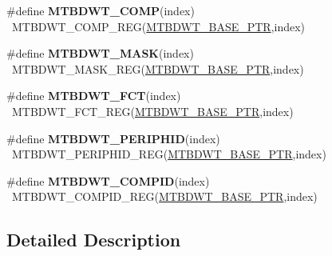 \begin{DoxyCompactItemize}
\item 
\hypertarget{group___m_t_b_d_w_t___register___accessor___macros_ga0b5afc3bbf7fb33c708cb7ebff8d1b02}{}\#define {\bfseries M\+T\+B\+D\+W\+T\+\_\+\+C\+O\+M\+P}(index)                                          ~M\+T\+B\+D\+W\+T\+\_\+\+C\+O\+M\+P\+\_\+\+R\+E\+G(\hyperlink{group___m_t_b_d_w_t___peripheral_ga97d048bfb5a11293a38c444b8347ff42}{M\+T\+B\+D\+W\+T\+\_\+\+B\+A\+S\+E\+\_\+\+P\+T\+R},index)\label{group___m_t_b_d_w_t___register___accessor___macros_ga0b5afc3bbf7fb33c708cb7ebff8d1b02}

\item 
\hypertarget{group___m_t_b_d_w_t___register___accessor___macros_ga599656176ea9b8570a4d7449d5b5a789}{}\#define {\bfseries M\+T\+B\+D\+W\+T\+\_\+\+M\+A\+S\+K}(index)                                          ~M\+T\+B\+D\+W\+T\+\_\+\+M\+A\+S\+K\+\_\+\+R\+E\+G(\hyperlink{group___m_t_b_d_w_t___peripheral_ga97d048bfb5a11293a38c444b8347ff42}{M\+T\+B\+D\+W\+T\+\_\+\+B\+A\+S\+E\+\_\+\+P\+T\+R},index)\label{group___m_t_b_d_w_t___register___accessor___macros_ga599656176ea9b8570a4d7449d5b5a789}

\item 
\hypertarget{group___m_t_b_d_w_t___register___accessor___macros_gac02bd48b3a9116f036027c930ad6034b}{}\#define {\bfseries M\+T\+B\+D\+W\+T\+\_\+\+F\+C\+T}(index)                                            ~M\+T\+B\+D\+W\+T\+\_\+\+F\+C\+T\+\_\+\+R\+E\+G(\hyperlink{group___m_t_b_d_w_t___peripheral_ga97d048bfb5a11293a38c444b8347ff42}{M\+T\+B\+D\+W\+T\+\_\+\+B\+A\+S\+E\+\_\+\+P\+T\+R},index)\label{group___m_t_b_d_w_t___register___accessor___macros_gac02bd48b3a9116f036027c930ad6034b}

\item 
\hypertarget{group___m_t_b_d_w_t___register___accessor___macros_ga29f7335807f02b6c76acf31f521eb8ab}{}\#define {\bfseries M\+T\+B\+D\+W\+T\+\_\+\+P\+E\+R\+I\+P\+H\+I\+D}(index)                                  ~M\+T\+B\+D\+W\+T\+\_\+\+P\+E\+R\+I\+P\+H\+I\+D\+\_\+\+R\+E\+G(\hyperlink{group___m_t_b_d_w_t___peripheral_ga97d048bfb5a11293a38c444b8347ff42}{M\+T\+B\+D\+W\+T\+\_\+\+B\+A\+S\+E\+\_\+\+P\+T\+R},index)\label{group___m_t_b_d_w_t___register___accessor___macros_ga29f7335807f02b6c76acf31f521eb8ab}

\item 
\hypertarget{group___m_t_b_d_w_t___register___accessor___macros_ga12a167f03c2333dd1f5e864a388e2084}{}\#define {\bfseries M\+T\+B\+D\+W\+T\+\_\+\+C\+O\+M\+P\+I\+D}(index)                                      ~M\+T\+B\+D\+W\+T\+\_\+\+C\+O\+M\+P\+I\+D\+\_\+\+R\+E\+G(\hyperlink{group___m_t_b_d_w_t___peripheral_ga97d048bfb5a11293a38c444b8347ff42}{M\+T\+B\+D\+W\+T\+\_\+\+B\+A\+S\+E\+\_\+\+P\+T\+R},index)\label{group___m_t_b_d_w_t___register___accessor___macros_ga12a167f03c2333dd1f5e864a388e2084}

\end{DoxyCompactItemize}


\subsection{Detailed Description}
